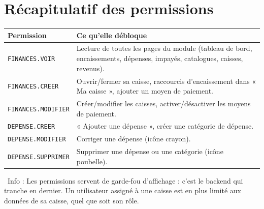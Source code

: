 \documentclass[12pt,a4paper]{article}
\newcommand{\info}[1]{\par\noindent\textcolor{lagoon}{\faInfoCircle\ Info : #1}\par}
\begin{document}
\newpage

\section{Récapitulatif des permissions}\label{sec:permissions}

\begin{center}
\begin{tabular}{p{5cm} p{9.5cm}}
\toprule
\textbf{Permission} & \textbf{Ce qu'elle débloque} \\
\midrule
\texttt{FINANCES.VOIR} & Lecture de toutes les pages du module (tableau de bord, encaissements, dépenses, impayés, catalogues, caisses, revenus). \\
\midrule
\texttt{FINANCES.CREER} & Ouvrir/fermer sa caisse, raccourcis d'encaissement dans « Ma caisse », ajouter un moyen de paiement. \\
\midrule
\texttt{FINANCES.MODIFIER} & Créer/modifier les caisses, activer/désactiver les moyens de paiement. \\
\midrule
\texttt{DEPENSE.CREER} & « Ajouter une dépense », créer une catégorie de dépense. \\
\midrule
\texttt{DEPENSE.MODIFIER} & Corriger une dépense (icône crayon). \\
\midrule
\texttt{DEPENSE.SUPPRIMER} & Supprimer une dépense ou une catégorie (icône poubelle). \\
\bottomrule
\end{tabular}
\end{center}

\info{Les permissions servent de garde-fou d'affichage : c'est le backend qui tranche en dernier. Un utilisateur assigné à une caisse est en plus limité aux données de sa caisse, quel que soit son rôle.}
\end{document}
